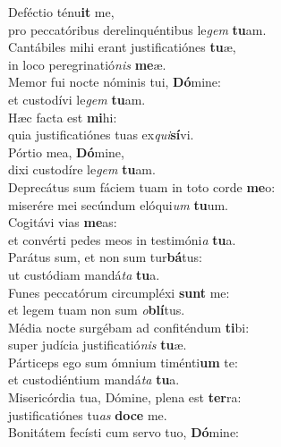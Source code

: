 \oddverse Deféctio ténu\textbf{it} me,~\*\\
\oddverse pro peccatóribus derelinquéntibus le\textit{gem} \textbf{tu}am.\\
\evenverse Cantábiles mihi erant justificatiónes \textbf{tu}æ,~\*\\
\evenverse in loco peregrinatió\textit{nis} \textbf{me}æ.\\
\oddverse Memor fui nocte nóminis tui, \textbf{Dó}mine:~\*\\
\oddverse et custodívi le\textit{gem} \textbf{tu}am.\\
\evenverse Hæc facta est \textbf{mi}hi:~\*\\
\evenverse quia justificatiónes tuas ex\textit{qui}\textbf{sí}vi.\\
\oddverse Pórtio mea, \textbf{Dó}mine,~\*\\
\oddverse dixi custodíre le\textit{gem} \textbf{tu}am.\\
\evenverse Deprecátus sum fáciem tuam in toto corde \textbf{me}o:~\*\\
\evenverse miserére mei secúndum elóqui\textit{um} \textbf{tu}um.\\
\oddverse Cogitávi vias \textbf{me}as:~\*\\
\oddverse et convérti pedes meos in testimóni\textit{a} \textbf{tu}a.\\
\evenverse Parátus sum, et non sum tur\textbf{bá}tus:~\*\\
\evenverse ut custódiam mandá\textit{ta} \textbf{tu}a.\\
\oddverse Funes peccatórum circumpléxi \textbf{sunt} me:~\*\\
\oddverse et legem tuam non sum \textit{o}\textbf{blí}tus.\\
\evenverse Média nocte surgébam ad confiténdum \textbf{ti}bi:~\*\\
\evenverse super judícia justificatió\textit{nis} \textbf{tu}æ.\\
\oddverse Párticeps ego sum ómnium timénti\textbf{um} te:~\*\\
\oddverse et custodiéntium mandá\textit{ta} \textbf{tu}a.\\
\evenverse Misericórdia tua, Dómine, plena est \textbf{ter}ra:~\*\\
\evenverse justificatiónes tu\textit{as} \textbf{do}\textbf{ce} me.\\
\oddverse Bonitátem fecísti cum servo tuo, \textbf{Dó}mine:~\*\\
